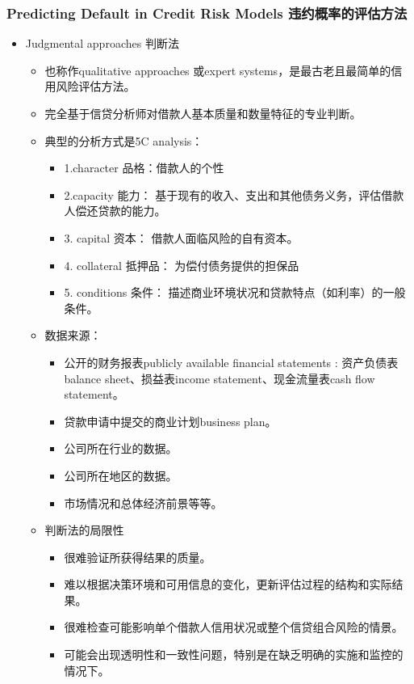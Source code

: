 \subsubsection{Predicting Default in Credit Risk Models 违约概率的评估方法}
\begin{itemize}
    \item Judgmental approaches 判断法
    \begin{itemize}
        \item 也称作qualitative approaches 或expert systems，是最古老且最简单的信用风险评估方法。
        \item 完全基于信贷分析师对借款人基本质量和数量特征的专业判断。 
        \item 典型的分析方式是5C analysis：
        \begin{itemize}
            \item 1.character 品格：借款人的个性
            \item 2.capacity 能力： 基于现有的收入、支出和其他债务义务，评估借款人偿还贷款的能力。
            \item 3. capital 资本： 借款人面临风险的自有资本。
            \item 4. collateral 抵押品： 为偿付债务提供的担保品
            \item 5. conditions 条件：  描述商业环境状况和贷款特点（如利率）的一般条件。
        \end{itemize}
        \item 数据来源：
        \begin{itemize}
            \item 公开的财务报表publicly available financial statements : 资产负债表
            balance sheet、损益表income statement、现金流量表cash flow
            statement。
            \item 贷款申请中提交的商业计划business plan。
            \item 公司所在行业的数据。
            \item 公司所在地区的数据。
            \item 市场情况和总体经济前景等等。
        \end{itemize}
        \item 判断法的局限性
        \begin{itemize}
            \item 很难验证所获得结果的质量。
            \item 难以根据决策环境和可用信息的变化，更新评估过程的结构和实际结果。
            \item 很难检查可能影响单个借款人信用状况或整个信贷组合风险的情景。
            \item 可能会出现透明性和一致性问题，特别是在缺乏明确的实施和监控的情况下。
        \end{itemize}
    \end{itemize}


\end{itemize}
